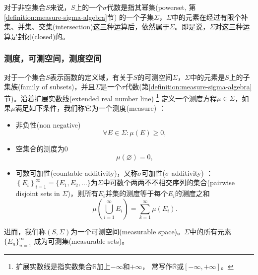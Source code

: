 对于非空集合$S$来说，$S$上的一个$\sigma$代数是指其幂集(powerset, 第\ref{definition:measure-sigma-algebra}节) 的一个子集$\Sigma$，$\Sigma$中的元素在经过有限个补集、并集、交集(intersection)这三种运算后，依然属于$\Sigma$。即是说，$\Sigma$对这三种运算是封闭(closed)的。

\subsubsection{测度，可测空间，测度空间}
\label{sec:measure-measure}
\begin{definition}[测度]
  对于一个集合$S$表示函数的定义域，有关于$S$的可测空间$\Sigma$，$\Sigma$中的元素是$S$上的子集族(family of subsets)，并且$\Sigma$是一个$\sigma$代数(第\ref{definition:measure-sigma-algebra}节)。沿着扩展实数线(extended real number line) 
  \footnote{扩展实数线是指实数集合$\mathbb{R}$加上$-\infty$和$+\infty$，
  常写作$\overline{\mathbb{R}}$或$\left[ -\infty, +\infty \right]$。}
  定义一个测度方程$\mu \in \Sigma$，如果$\mu$满足如下条件，我们称它为一个测度(measure) ：
  \begin{itemize}
    \item 非负性(non negative)
    \begin{equation*}
      \forall E \in \Sigma: \mu(E) \ge 0,
    \end{equation*}
    \item 空集合的测度为$0$
    \begin{equation}
      \mu(\varnothing) = 0,
    \end{equation}
    \item 可数可加性(countable additivity)，又称$\sigma$可加性($\sigma$ additivity) ：$\left\{ E_i \right\}_{i=1}^{\infty}  = \{ E_1,E_2,\ldots \}$为$\Sigma$中可数个两两不不相交序列的集合(pairwise disjoint sets in $\Sigma$)，则所有$E_i$并集的测度等于每个$E_i$的测度之和
    \begin{equation*}
      \mu \left( \bigcup_{i=1}^{\infty} E_i \right) = \sum_{k=1}^{\infty} \mu(E_i).
    \end{equation*}
  \end{itemize}
\end{definition}

\begin{definition}[可测空间]
进而，我们称$\left( S, \Sigma \right)$为一个可测空间(measurable space)。$\Sigma$中的所有元素$\{ E_n \}_{n=1}^{\infty}$ 成为可测集(measurable sets)。
\end{definition}

